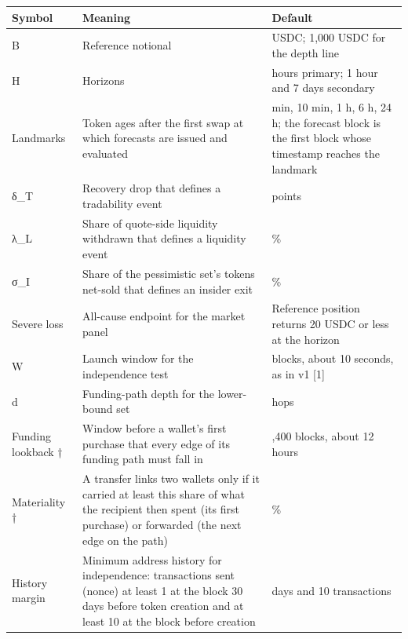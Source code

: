 {\def\LTcaptype{none} %
\begin{longtable}[]{@{}
  >{\raggedright\arraybackslash}p{}
  >{\raggedright\arraybackslash}p{}
  >{\raggedright\arraybackslash}p{}@{}}
\toprule\noalign{}
\begin{minipage}[b]{\linewidth}\raggedright
Symbol
\end{minipage} & \begin{minipage}[b]{\linewidth}\raggedright
Meaning
\end{minipage} & \begin{minipage}[b]{\linewidth}\raggedright
Default
\end{minipage} \\
\midrule\noalign{}
\endhead
\bottomrule\noalign{}
\endlastfoot
B & Reference notional & 100 USDC; 1,000 USDC for the depth line \\
H & Horizons & 24 hours primary; 1 hour and 7 days secondary \\
Landmarks & Token ages after the first swap at which forecasts are issued and evaluated & 1 min, 10 min, 1 h, 6 h, 24 h; the forecast block is the first block whose timestamp reaches the landmark \\
δ\_T & Recovery drop that defines a tradability event & 20 points \\
λ\_L & Share of quote-side liquidity withdrawn that defines a liquidity event & 50\% \\
σ\_I & Share of the pessimistic set's tokens net-sold that defines an insider exit & 50\% \\
Severe loss & All-cause endpoint for the market panel & Reference position returns 20 USDC or less at the horizon \\
W & Launch window for the independence test & 20 blocks, about 10 seconds, as in v1 {[}1{]} \\
d & Funding-path depth for the lower-bound set & 3 hops \\
Funding lookback † & Window before a wallet's first purchase that every edge of its funding path must fall in & 86,400 blocks, about 12 hours \\
Materiality † & A transfer links two wallets only if it carried at least this share of what the recipient then spent (its first purchase) or forwarded (the next edge on the path) & 50\% \\
History margin & Minimum address history for independence: transactions sent (nonce) at least 1 at the block 30 days before token creation and at least 10 at the block before creation & 30 days and 10 transactions \\

\end{longtable}}
